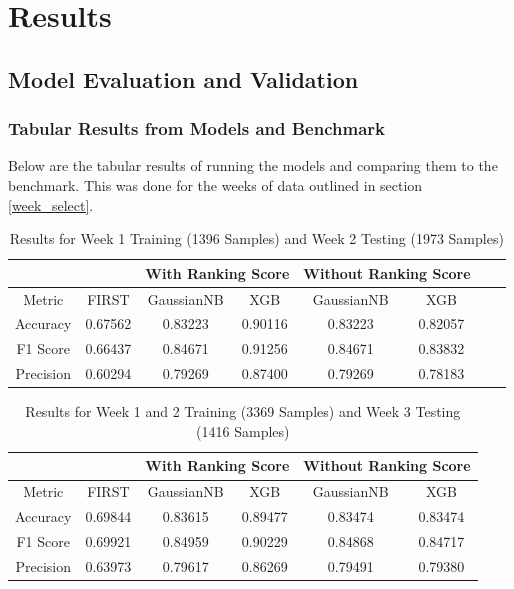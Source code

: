 \documentclass{article}
\begin{document}
\section{Results} \label{Results}

\subsection{Model Evaluation and Validation}

\subsubsection{Tabular Results from Models and Benchmark} \label{tabular_results}
\par
Below are the tabular results of running the models and comparing them to the benchmark. This was done for the weeks of data outlined in section \ref{week_select}.

\begin{table}[H]
    \caption{Results for Week 1 Training (1396 Samples) and Week 2 Testing (1973 Samples)}
    \centering
    \begin{tabular} { |c|c|c|c|c|c|c|c| }
    \hline
    \multicolumn{2}{|c|}{} & \multicolumn{2}{|c|}{With Ranking Score} & \multicolumn{2}{|c|}{Without Ranking Score} \\
    \hline
    Metric & FIRST & GaussianNB & XGB & GaussianNB & XGB \\
    \hline
    Accuracy & 0.67562 & 0.83223 & 0.90116 & 0.83223 & 0.82057 \\
    \hline
    F1 Score & 0.66437 & 0.84671 & 0.91256 & 0.84671 & 0.83832 \\
    \hline
    Precision & 0.60294 & 0.79269 & 0.87400 & 0.79269 & 0.78183 \\
    \hline
    \end{tabular}
    \label{table:results_week_1}
\end{table}

\begin{table}[H]
    \caption{Results for Week 1 and 2 Training (3369 Samples) and Week 3 Testing (1416 Samples)}
    \centering
    \begin{tabular} { |c|c|c|c|c|c| }
    \hline
    \multicolumn{2}{|c|}{} & \multicolumn{2}{|c|}{With Ranking Score} & \multicolumn{2}{|c|}{Without Ranking Score} \\
    \hline
    Metric & FIRST & GaussianNB & XGB & GaussianNB & XGB \\
    \hline
    Accuracy & 0.69844 & 0.83615 & 0.89477 & 0.83474 & 0.83474 \\
    \hline
    F1 Score & 0.69921 & 0.84959 & 0.90229 & 0.84868 & 0.84717 \\
    \hline
    Precision & 0.63973 & 0.79617 & 0.86269 & 0.79491 & 0.79380 \\
    \hline
    \end{tabular}
    \label{table:results_week_2}
\end{table}
\end{document}
